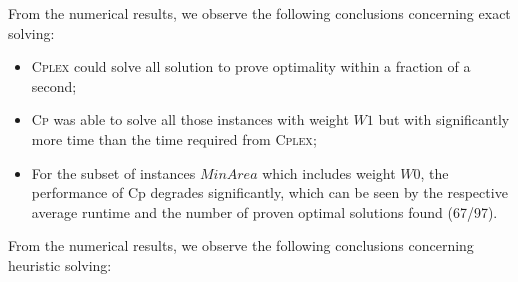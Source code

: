 \documentclass[runningheads,a4paper]{elsarticle}
\begin{document}
        From the numerical results, we observe the following conclusions concerning exact solving:
        \begin{itemize}
        	\item  \textsc{Cplex} could solve all solution to prove optimality within a fraction of a second;
        	\item   \textsc{Cp} was able to solve all those instances with weight $W1$ but with significantly more time than the time required from \textsc{Cplex};
        	\item For the subset of instances $MinArea$ which includes weight $W0$, the performance of Cp degrades significantly, which can be seen  by the respective average runtime and the number of proven optimal solutions found (67/97).
        \end{itemize}
     From the numerical results, we observe the following conclusions concerning heuristic solving:
\end{document}
